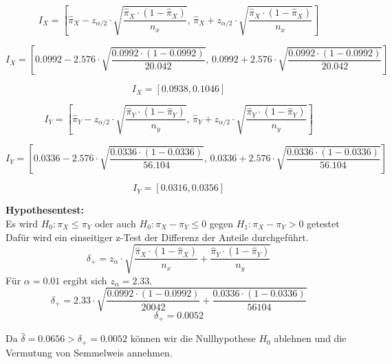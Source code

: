 \documentclass[a4paper,12pt]{article}
\begin{document}
\begin{equation}
  I_X = \left[\hat{\pi}_X - z_{\alpha/2} \cdot \sqrt{\frac{\hat{\pi}_X \cdot (1-\hat{\pi}_X)}{n_x}}, \, 
  \hat{\pi}_X + z_{\alpha/2} \cdot \sqrt{\frac{\hat{\pi}_X \cdot (1-\hat{\pi}_X)}{n_x}}\right]
\end{equation}

\begin{equation}
  I_X = \left[0.0992 - 2.576 \cdot \sqrt{\frac{0.0992 \cdot (1-0.0992)}{20.042}}, \, 
  0.0992 + 2.576 \cdot \sqrt{\frac{0.0992 \cdot (1-0.0992)}{20.042}}\right]
\end{equation}

\[
I_X = [0.0938, 0.1046]
\]

\begin{equation}
  I_Y = \left[\hat{\pi}_Y - z_{\alpha/2} \cdot \sqrt{\frac{\hat{\pi}_Y \cdot (1-\hat{\pi}_Y)}{n_y}}, \, 
  \hat{\pi}_Y + z_{\alpha/2} \cdot \sqrt{\frac{\hat{\pi}_Y \cdot (1-\hat{\pi}_Y)}{n_y}}\right]
\end{equation}

\begin{equation}
  I_Y = \left[0.0336 - 2.576 \cdot \sqrt{\frac{0.0336 \cdot (1-0.0336)}{56.104}}, \, 
  0.0336 + 2.576 \cdot \sqrt{\frac{0.0336 \cdot (1-0.0336)}{56.104}}\right]
\end{equation}

\[
I_Y = [0.0316, 0.0356]
\]

\textbf{Hypothesentest:} \\
Es wird $H_0 : \pi_X \leq \pi_Y $ oder auch $H_0 : \pi_X - \pi_Y \leq 0$ gegen $H_1 : \pi_X - \pi_Y > 0$ getestet\\
Dafür wird ein einseitiger z-Test der Differenz der Anteile durchgeführt. \\
\begin{equation}
  \delta_+ = z_{\alpha} \cdot \sqrt{\frac{\hat{\pi}_X \cdot (1-\hat{\pi}_X)}{n_x} + \frac{\hat{\pi}_Y \cdot (1-\hat{\pi}_Y)}{n_y}}
\end{equation}
Für $\alpha = 0.01$ ergibt sich $z_{\alpha} = 2.33$.
\begin{equation}
  \delta_+ = 2.33 \cdot \sqrt{\frac{0.0992 \cdot (1-0.0992)}{20042} + \frac{0.0336 \cdot (1-0.0336)}{56104}}
\end{equation}
\begin{equation}
  \delta_+ = 0.0052
\end{equation}

Da $\hat{\delta} = 0.0656 > \delta_+ = 0.0052$ können wir die Nullhypothese $H_0$ ablehnen und die Vermutung von Semmelweis annehmen.
\end{document}
